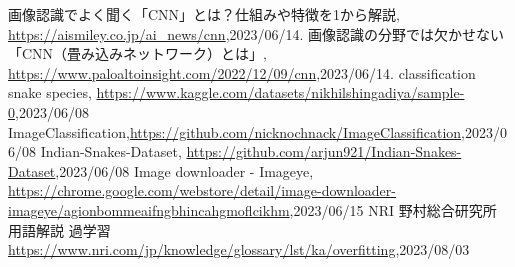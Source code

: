 \documentclass[a4paper, 11pt, titlepage]{jsarticle}
\begin{document}
\begin{thebibliography}{n}
	画像認識でよく聞く「CNN」とは？仕組みや特徴を1から解説, \url{https://aismiley.co.jp/ai_news/cnn},2023/06/14.
	画像認識の分野では欠かせない「CNN（畳み込みネットワーク）とは」, \url{https://www.paloaltoinsight.com/2022/12/09/cnn},2023/06/14.
	classification snake species, \url{https://www.kaggle.com/datasets/nikhilshingadiya/sample-0},2023/06/08
	ImageClassification,\url{https://github.com/nicknochnack/ImageClassification},2023/06/08
	Indian-Snakes-Dataset, \url{https://github.com/arjun921/Indian-Snakes-Dataset},2023/06/08
	Image downloader - Imageye, \url{https://chrome.google.com/webstore/detail/image-downloader-imageye/agionbommeaifngbhincahgmoflcikhm},2023/06/15
	NRI 野村総合研究所 用語解説 過学習\url{https://www.nri.com/jp/knowledge/glossary/lst/ka/overfitting},2023/08/03
\end{thebibliography}
\end{document}
